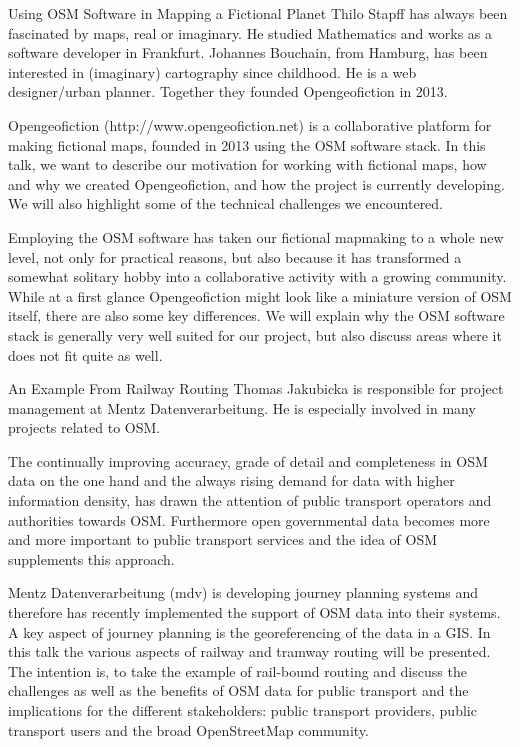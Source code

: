 %
{Using OSM Software in Mapping a Fictional Planet}%
{Thilo Stapff has always been fascinated by maps, real or imaginary. 
He studied Mathematics and works as a software developer in Frankfurt. Johannes Bouchain, from Hamburg, has been interested in (imaginary) cartography since childhood. He is a web designer/urban planner. Together they founded Opengeofiction in 2013.  }%
{Opengeofiction (http://www.opengeofiction.net) is a collaborative platform for making fictional maps, founded in 2013 using the OSM software stack. In this talk, we want to describe our motivation for working with fictional maps, how and why we created Opengeofiction, and how the project is currently developing. We will also highlight some of the technical challenges we encountered.

Employing the OSM software has taken our fictional mapmaking to a whole new level, not only for practical reasons, but also because it has transformed a somewhat solitary hobby into a collaborative activity with a growing community. While at a first glance Opengeofiction might look like a miniature version of OSM itself, there are also some key differences. We will explain why the OSM software stack is generally very well suited for our project, but also discuss areas where it does not fit quite as well.
}

%
{An Example From Railway Routing}%
{Thomas Jakubicka is responsible for project management at Mentz Datenverarbeitung. He is especially involved in many projects related to OSM.}%
{The continually improving accuracy, grade of detail and completeness in OSM data on the one hand and the always rising demand for data with higher information density, has drawn the attention of public transport operators and authorities towards OSM. Furthermore open governmental data becomes more and more important to public transport services and the idea of OSM supplements this approach.

Mentz Datenverarbeitung (mdv) is developing journey planning systems and therefore has recently implemented the support of OSM data into their systems. A key aspect of journey planning is the georeferencing of the data in a GIS. In this talk the various aspects of railway and tramway routing will be presented. The intention is, to take the example of rail-bound routing and discuss the challenges as well as the benefits of OSM data for public transport and the implications for the different stakeholders: public transport providers, public transport users and the broad OpenStreetMap community.}



